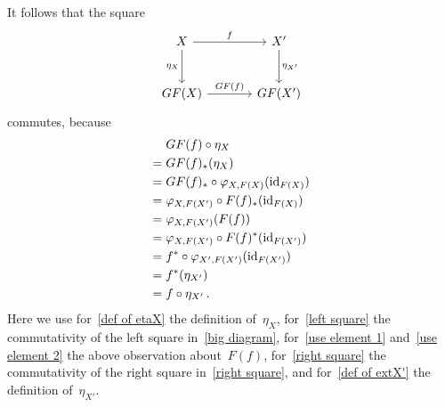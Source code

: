 \begin{remark}[label = triangle equalities]
\begin{enumerate}
      It follows that the square
      \[
        \begin{tikzcd}[sep = large]
            X
            \arrow{r}[above]{f}
            \arrow{d}[left]{\eta_X}
          & X'
            \arrow{d}[right]{\eta_{X'}}
          \\
            GF(X)
            \arrow{r}[above]{GF(f)}
          & GF(X')
        \end{tikzcd}
      \]
      commutes, because
      \begin{align}
         {}&  GF(f) \circ \eta_X  \notag  \\
        ={}&  GF(f)_*( \eta_X ) \notag  \\
        ={}&  GF(f)_* \circ \varphi_{X,F(X)}( \operatorname{id}_{F(X)} )  \label{def of etaX} \\
        ={}&  \varphi_{X, F(X')} \circ F(f)_*( \operatorname{id}_{F(X)} ) \label{left square} \\
        ={}&  \varphi_{X, F(X')}(F(f))  \label{use element 1} \\
        ={}&  \varphi_{X, F(X')} \circ F(f)^*( \operatorname{id}_{F(X')} )  \label{use element 2} \\
        ={}&  f^* \circ \varphi_{X', F(X')}( \operatorname{id}_{F(X')} )  \label{right square}  \\
        ={}&  f^* ( \eta_{X'} \label{def of extX'} )  \\
        ={}&  f \circ \eta_{X'} \notag  \,.
      \end{align}
      Here we use for~\eqref{def of etaX} the definition of~$\eta_X$, for~\eqref{left square} the commutativity of the left square in~\eqref{big diagram}, for~\eqref{use element 1} and~\eqref{use element 2} the above observation about~$F(f)$, for~\eqref{right square} the commutativity of the right square in~\eqref{right square}, and for~\eqref{def of extX'} the definition of~$\eta_{X'}$.
      

\end{enumerate}
\end{remark}
